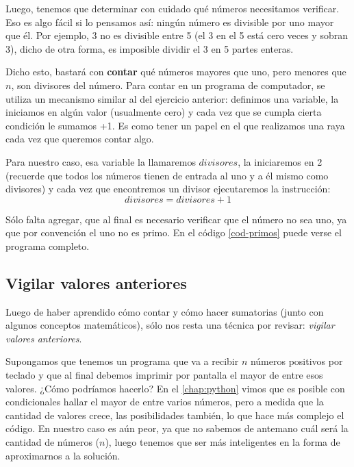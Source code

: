 Luego, tenemos que determinar con cuidado qué números necesitamos verificar. Eso es algo fácil si lo pensamos así: ningún número es divisible por uno mayor que él. Por ejemplo, 3 no es divisible entre 5 (el 3 en el 5 está cero veces y sobran 3), dicho de otra forma, es imposible dividir el 3 en 5 partes enteras.

Dicho esto, bastará con \textbf{contar} qué números mayores que uno, pero menores que $n$, son divisores del número. Para contar en un programa de computador, se utiliza un mecanismo similar al del ejercicio anterior: definimos una variable, la iniciamos en algún valor (usualmente cero) y cada vez que se cumpla cierta condición le sumamos +1. Es como tener un papel en el que realizamos una raya cada vez que queremos contar algo.

Para nuestro caso, esa variable la llamaremos $divisores$, la iniciaremos en 2 (recuerde que todos los números tienen de entrada al uno y a él mismo como divisores) y cada vez que encontremos un divisor ejecutaremos la instrucción:
\begin{equation}
divisores = divisores + 1
\end{equation}

Sólo falta agregar, que al final es necesario verificar que el número no sea uno, ya que por convención el uno no es primo. En el código \ref{cod-primos} puede verse el programa completo.  \\




\subsection{Vigilar valores anteriores}

Luego de haber aprendido cómo contar y cómo hacer sumatorias (junto con algunos conceptos matemáticos), sólo nos resta una técnica por revisar: \emph{vigilar valores anteriores}.

Supongamos que tenemos un programa que va a recibir $n$ números positivos por teclado y que al final debemos imprimir por pantalla el mayor de entre esos valores. ¿Cómo podríamos hacerlo? En el \autoref{chap:python} vimos que es posible con condicionales hallar el mayor de entre varios números, pero a medida que la cantidad de valores crece, las posibilidades también, lo que hace más complejo el código. En nuestro caso es aún peor, ya que no sabemos de antemano cuál será la cantidad de números ($n$), luego tenemos que ser más inteligentes en la forma de aproximarnos a la solución.

